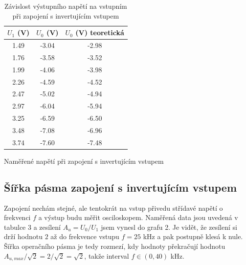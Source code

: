 \documentclass[a4paper,11pt]{article}
\begin{document}
\begin{table}[h]
    \begin{minipage}{.45\linewidth}
    \vspace{-15pt}
    \centering
    \begin{tabular}{| c c c | }
        \hline
        $ U_1 $ (V) & $ U_0 $ (V) & $ U_0 $ (V)  teoretická \\ \hline
        1.49 & -3.04 & -2.98 \\
        1.76 & -3.58 & -3.52 \\
        1.99 & -4.06 & -3.98 \\
        2.26 & -4.59 & -4.52 \\
        2.47 & -5.02 & -4.94 \\
        2.97 & -6.04 & -5.94 \\
        3.25 & -6.59 & -6.50 \\
        3.48 & -7.08 & -6.96 \\
        3.74 & -7.60 & -7.48 \\
        \hline
    \end{tabular}
    \caption{Naměřené napětí při zapojení s invertujícím vstupem}
    \end{minipage} 
    \hfill
    \begin{minipage}{.5\linewidth}
        \centering
        \resizebox{\textwidth}{!}{  }
        \captionsetup{type=graph}
        \caption{Závislost výstupního napětí na vstupním při zapojení s invertujícím vstupem}
    \end{minipage} 
\end{table}

\subsection{Šířka pásma zapojení s invertujícím vstupem}

Zapojení nechám stejné, ale tentokrát na vstup přivedu střídavé napětí o frekvenci $ f $ a výstup budu měřit osciloskopem. Naměřená data jsou uvedená v tabulce 3 a zesílení $ A_u = U_0 / U_1 $ jsem vynesl do grafu 2. Je vidět, že zesílení si drží hodnotu $ 2 $ až do frekvence vstupu $ f = 25 $ kHz a pak postupně klesá k nule. Šířka operačního pásma je tedy rozmezí, kdy hodnoty překračují hodnotu $ A_{u,max} / \sqrt{2} = 2 / \sqrt{2} = \sqrt{2}    $, takže interval $ f \in (0, 40) $   kHz.

\newpage
\end{document}
